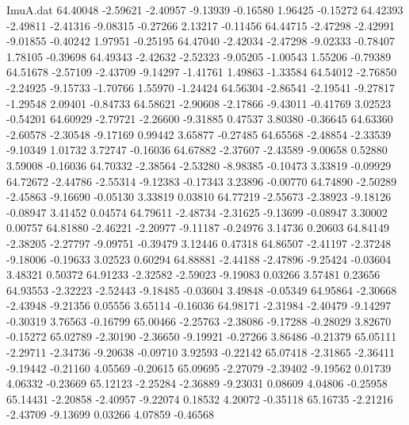 \begin{filecontents}{ImuA.dat}
  64.40048   -2.59621   -2.40957   -9.13939   -0.16580    1.96425   -0.15272
  64.42393   -2.49811   -2.41316   -9.08315   -0.27266    2.13217   -0.11456
  64.44715   -2.47298   -2.42991   -9.01855   -0.40242    1.97951   -0.25195
  64.47040   -2.42034   -2.47298   -9.02333   -0.78407    1.78105   -0.39698
  64.49343   -2.42632   -2.52323   -9.05205   -1.00543    1.55206   -0.79389
  64.51678   -2.57109   -2.43709   -9.14297   -1.41761    1.49863   -1.33584
  64.54012   -2.76850   -2.24925   -9.15733   -1.70766    1.55970   -1.24424
  64.56304   -2.86541   -2.19541   -9.27817   -1.29548    2.09401   -0.84733
  64.58621   -2.90608   -2.17866   -9.43011   -0.41769    3.02523   -0.54201
  64.60929   -2.79721   -2.26600   -9.31885    0.47537    3.80380   -0.36645
  64.63360   -2.60578   -2.30548   -9.17169    0.99442    3.65877   -0.27485
  64.65568   -2.48854   -2.33539   -9.10349    1.01732    3.72747   -0.16036
  64.67882   -2.37607   -2.43589   -9.00658    0.52880    3.59008   -0.16036
  64.70332   -2.38564   -2.53280   -8.98385   -0.10473    3.33819   -0.09929
  64.72672   -2.44786   -2.55314   -9.12383   -0.17343    3.23896   -0.00770
  64.74890   -2.50289   -2.45863   -9.16690   -0.05130    3.33819    0.03810
  64.77219   -2.55673   -2.38923   -9.18126   -0.08947    3.41452    0.04574
  64.79611   -2.48734   -2.31625   -9.13699   -0.08947    3.30002    0.00757
  64.81880   -2.46221   -2.20977   -9.11187   -0.24976    3.14736    0.20603
  64.84149   -2.38205   -2.27797   -9.09751   -0.39479    3.12446    0.47318
  64.86507   -2.41197   -2.37248   -9.18006   -0.19633    3.02523    0.60294
  64.88881   -2.44188   -2.47896   -9.25424   -0.03604    3.48321    0.50372
  64.91233   -2.32582   -2.59023   -9.19083    0.03266    3.57481    0.23656
  64.93553   -2.32223   -2.52443   -9.18485   -0.03604    3.49848   -0.05349
  64.95864   -2.30668   -2.43948   -9.21356    0.05556    3.65114   -0.16036
  64.98171   -2.31984   -2.40479   -9.14297   -0.30319    3.76563   -0.16799
  65.00466   -2.25763   -2.38086   -9.17288   -0.28029    3.82670   -0.15272
  65.02789   -2.30190   -2.36650   -9.19921   -0.27266    3.86486   -0.21379
  65.05111   -2.29711   -2.34736   -9.20638   -0.09710    3.92593   -0.22142
  65.07418   -2.31865   -2.36411   -9.19442   -0.21160    4.05569   -0.20615
  65.09695   -2.27079   -2.39402   -9.19562    0.01739    4.06332   -0.23669
  65.12123   -2.25284   -2.36889   -9.23031    0.08609    4.04806   -0.25958
  65.14431   -2.20858   -2.40957   -9.22074    0.18532    4.20072   -0.35118
  65.16735   -2.21216   -2.43709   -9.13699    0.03266    4.07859   -0.46568

\end{filecontents}
